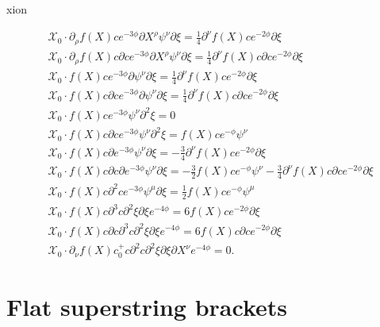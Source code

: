 xion\documentclass[12pt]{article}
\numberwithin{equation}{section}
\begin{document}
{\begin{align}
\label{PCO12}
& \mathcal{X}_0 \cdot \partial_\rho f(X) c e^{-3\phi}  \partial X^\rho \psi^\nu \partial \xi =  \frac{1}{4} \partial^\nu f(X) c e^{-2\phi} \partial \xi\\
\label{PCO13}
&  \mathcal{X}_0\cdot \partial_\rho f(X) c \partial c e^{-3 \phi}\partial X^\rho \psi^\nu \partial\xi = \frac{1}{4} \partial^\nu f(X) c \partial c e^{-2\phi}\partial \xi \\
\label{PCO14}
&  \mathcal{X}_0  \cdot f(X) c e^{-3\phi} \partial \psi^\nu \partial \xi = \frac{1}{4} \partial^\nu f(X) c e^{-2\phi}\partial\xi \\
\label{PCO15}
&  \mathcal{X}_0  \cdot f(X) c \partial c e^{-3 \phi}\partial \psi^\nu \partial \xi = \frac{1}{4}\partial^\nu f(X) c\partial c e^{-2\phi}\partial\xi \\
\label{PCO16}
&  \mathcal{X}_0 \cdot  f(X) c e^{-3 \phi} \psi^\nu \partial^2 \xi = 0 \\
\label{PCO17}
&  \mathcal{X}_0 \cdot f(X) c \partial c e^{-3\phi} \psi^\nu \partial^2 \xi =f(X) c e^{-\phi}\psi^\nu \\
\label{PCO18}
&  \mathcal{X}_0 \cdot f(X) c \partial e^{-3\phi}\psi^\nu \partial\xi = - \frac{3}{4}
\partial^\nu f(X) c e^{-2\phi}\partial \xi \\
\label{PCO19}
&  \mathcal{X}_0  \cdot f(X) c \partial c \partial e^{-3 \phi} \psi^\nu \partial \xi = -\frac{3}{2} f(X) c e^{-\phi} \psi^\nu - \frac{3}{4} \partial^\nu f(X) c \partial c e^{-2 \phi}\partial \xi \\
\label{PCO20}
& \mathcal{X}_0 \cdot f(X) c \partial^2 c e^{-3 \phi} \psi^\mu \partial \xi = \frac{1}{2}f(X) c e^{-\phi}\psi ^\mu \\
\label{PCO21}
& \mathcal{X}_0 \cdot  f(X) c \partial^3 c \partial^2 \xi \partial \xi  e^{-4 \phi} = 6 f(X) c e^{-2 \phi}\partial \xi \\
\label{PCO22}
& \mathcal{X}_0 \cdot  f(X) c \partial c \partial^3 c \partial^2 \xi \partial \xi  e^{-4 \phi} = 6 f(X) c \partial c e^{-2 \phi} \partial \xi \\
\label{PCO23}
   & \mathcal{X}_0 \cdot \partial_\nu f(X) c_0^+ c  \partial^2 c \partial^2 \xi \partial \xi \partial X^\nu e^{-4 \phi} = 0.
\end{align}
}


\section{Flat superstring brackets}
\label{sec:flatvert}

\end{document}
